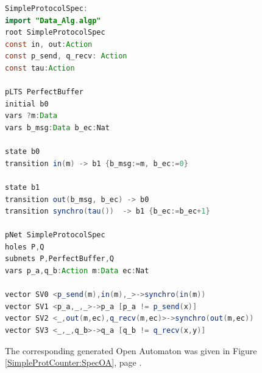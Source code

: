\documentclass{elsarticle}
\begin{document}
\begin{lstlisting}[basicstyle=\scriptsize\ttfamily, language=java, frame=single]
SimpleProtocolSpec:
import "Data_Alg.algp"
root SimpleProtocolSpec
const in, out:Action
const p_send, q_recv: Action
const tau:Action

pLTS PerfectBuffer
initial b0 
vars ?m:Data
vars b_msg:Data b_ec:Nat

state b0
transition in(m) -> b1 {b_msg:=m, b_ec:=0}

state b1
transition out(b_msg, b_ec) -> b0
transition synchro(tau())  -> b1 {b_ec:=b_ec+1}

pNet SimpleProtocolSpec
holes P,Q
subnets P,PerfectBuffer,Q
vars p_a,q_b:Action m:Data ec:Nat

vector SV0 <p_send(m),in(m),_>->synchro(in(m))
vector SV1 <p_a,_,_>->p_a [p_a != p_send(x)]
vector SV2 <_,out(m,ec),q_recv(m,ec)>->synchro(out(m,ec))
vector SV3 <_,_,q_b>->q_a [q_b != q_recv(x,y)]

  \end{lstlisting}




\bigskip
The corresponding generated Open Automaton was given in Figure \ref{SimpleProtCounter:SpecOA},
page \pageref{SimpleProtCounter:SpecOA}.\\
\end{document}
